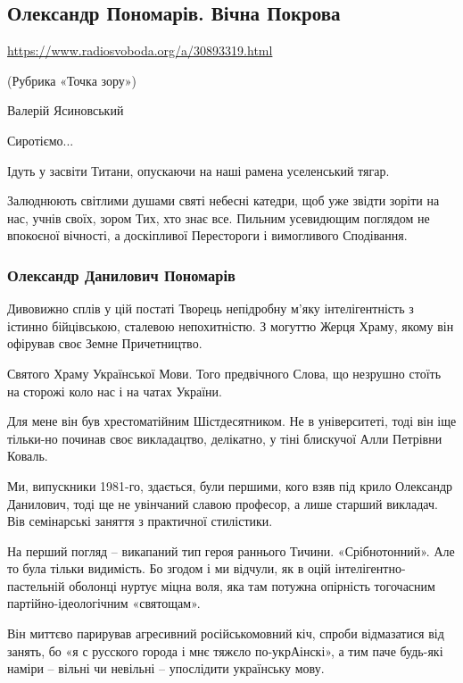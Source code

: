  
 

\subsection{Олександр Пономарів. Вічна Покрова}

\url{https://www.radiosvoboda.org/a/30893319.html}

(Рубрика «Точка зору»)

Валерій Ясиновський

Сиротіємо...

Ідуть у засвіти Титани, опускаючи на наші рамена уселенський тягар.

Залюднюють світлими душами святі небесні катедри, щоб уже звідти зоріти на нас,
учнів своїх, зором Тих, хто знає все. Пильним усевидющим поглядом не впокоєної
вічності, а доскіпливої Перестороги і вимогливого Сподівання.

\subsubsection{Олександр Данилович Пономарів}

Дивовижно сплів у цій постаті Творець непідробну м'яку інтелігентність з
істинно бійцівською, сталевою непохитністю. З могуттю Жерця Храму, якому він
офірував своє Земне Причетництво.

Святого Храму Української Мови. Того предвічного Слова, що незрушно стоїть на
сторожі коло нас і на чатах України. 

Для мене він був хрестоматійним Шістдесятником. Не в університеті, тоді він іще
тільки-но починав своє викладацтво, делікатно, у тіні блискучої Алли Петрівни
Коваль.

Ми, випускники 1981-го, здається, були першими, кого взяв під крило Олександр
Данилович, тоді ще не увінчаний славою професор, а лише старший викладач. Вів
семінарські заняття з практичної стилістики.

На перший погляд – викапаний тип героя раннього Тичини. «Срібнотонний». Але то
була тільки видимість. Бо згодом і ми відчули, як в оцій
інтелігентно-пастельній оболонці нуртує міцна воля, яка там потужна опірність
тогочасним партійно-ідеологічним «святощам».

Він миттєво парирував агресивний російськомовний кіч, спроби відмазатися від
занять, бо «я с русского города і мнє тяжєло по-укрАінскі», а тим паче будь-які
наміри – вільні чи невільні – упослідити українську мову.

